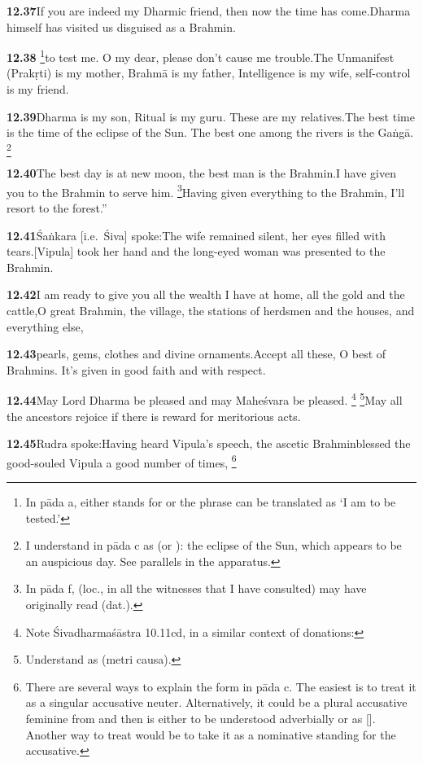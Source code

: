 \textbf{12.37}If you are indeed my Dharmic friend, then now the time has come.Dharma himself has visited us disguised as a Brahmin.%


\textbf{12.38}%
\footnote{In pāda a,  either stands for  or the phrase  can be                  translated as `I am to be tested.'  }to test me. O my dear, please don't cause me trouble.The Unmanifest (Prakṛti) is my mother, Brahmā is my father,                 Intelligence is my wife, self-control is my friend.%


\textbf{12.39}Dharma is my son, Ritual is my guru. These are my relatives.The best time is the time of the eclipse of the Sun.                The best one among the rivers is the Gaṅgā.%
\footnote{I understand  in pāda c as  (or ):                the eclipse of the Sun, which appears to be an auspicious day. See parallels in the apparatus.  }%


\textbf{12.40}The best day is at new moon, the best man is the Brahmin.I have given you to the Brahmin to serve him.%
\footnote{In pāda f,  (loc., in all the witnesses that I have consulted)                                  may have originally read  (dat.).  }Having given everything to the Brahmin, I'll resort to the forest.''%


\textbf{12.41}Śaṅkara [i.e.\ Śiva] spoke:The wife remained silent, her eyes filled with tears.[Vipula] took her hand and the long-eyed woman was presented to the Brahmin.%


\textbf{12.42}I am ready to give you all the wealth I have at home, all the gold and the cattle,O great Brahmin, the village, the stations of herdsmen and the houses,                        and everything else,%


\textbf{12.43}pearls, gems, clothes and divine ornaments.Accept all these, O best of Brahmins. It's given in good faith and with respect.%


\textbf{12.44}May Lord Dharma be pleased and may Maheśvara be pleased.%
\footnote{Note Śivadharmaśāstra 10.11cd, in a similar context of donations:                   }%
\footnote{Understand  as  (metri causa).  }May all the ancestors rejoice if there is reward for meritorious acts.%


\textbf{12.45}Rudra spoke:Having heard Vipula's speech, the ascetic Brahminblessed the good-souled Vipula a good number of times,%
\footnote{There are several ways to explain the form  in pāda c.               The easiest is to treat it as a singular accusative neuter.               Alternatively, it could be a plural accusative feminine from  and               then  is either to be understood adverbially or as [].               Another way to treat  would be to take it as a nominative standing               for the accusative.  }%


